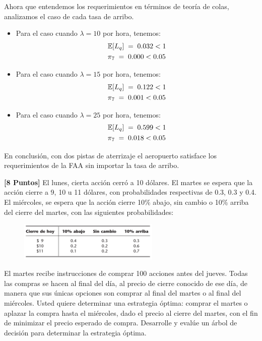 \documentclass[ a4paper, twoside, 11pt]{article}
\begin{document}
\begin{problem}
\begin{enumerate}[label=\textbf{\alph*)}]
Ahora que entendemos los requerimientos en t\'erminos de teor\'ia de colas, analizamos el caso de cada tasa de arribo. 
\begin{itemize}
\item Para el caso cuando $\lambda = 10$ por hora, tenemos: 
\begin{align*}
& \mathbb{E}[L_q] \; = \; 0.032 < 1 \\
& \pi_7 \; = \; 0.000 < 0.05
\end{align*}
\item Para el caso cuando $\lambda = 15$ por hora, tenemos: 
\begin{align*}
& \mathbb{E}[L_q] \; = \; 0.122 < 1 \\
& \pi_7 \; = \; 0.001 < 0.05
\end{align*}
\item Para el caso cuando $\lambda = 25$ por hora, tenemos: 
\begin{align*}
& \mathbb{E}[L_q] \; = \; 0.599 < 1 \\
& \pi_7 \; = \; 0.018 < 0.05
\end{align*}
\end{itemize}
En conclusi\'on, con dos pistas de aterrizaje el aeropuerto satisface los requerimientos de la FAA sin importar la tasa de arribo. 

\end{enumerate}

\end{problem}
\fullskip

\begin{problem}
\textbf{[8 Puntos]} El lunes, cierta acci\'on cerr\'o a 10 d\'olares. El martes se espera que la acci\'on cierre a 9, 10 u 11 d\'olares, con probabilidades respectivas de 0.3, 0.3 y 0.4. El mi\'ercoles, \linebreak se espera que la acci\'on cierre 10\% abajo, sin cambio o 10\% arriba del cierre del martes, con las siguientes probabilidades: 

\begin{figure}[htb]
\centering
\includegraphics[width=0.6\textwidth]{problema-acciones.jpg}
\end{figure}

El martes recibe instrucciones de comprar 100 acciones antes del jueves. Todas las compras se hacen al final del d\'ia, al precio de cierre conocido de ese d\'ia, de manera que sus \'unicas opciones son comprar al final del martes o al final del mi\'ercoles. Usted quiere determinar una estrategia \'optima: comprar el martes o aplazar la compra hasta el mi\'ercoles, dado el precio al cierre del martes, con el fin de minimizar el precio esperado de compra. Desarrolle y eval\'ue un \'arbol de decisi\'on para determinar la estrategia \'optima. 
\end{problem}
\fullskip
\end{document}

